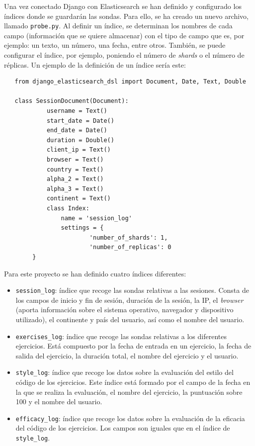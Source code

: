 Una vez conectado Django con Elasticsearch se han definido y configurado los índices donde se guardarán las sondas. Para ello, se ha creado un nuevo archivo, llamado \texttt{probe.py}. Al definir un índice, se determinan los nombres de cada campo (información que se quiere almacenar) con el tipo de campo que es, por ejemplo: un texto, un número, una fecha, entre otros. También, se puede configurar el índice, por ejemplo, poniendo el número de\textit{ shards }o el número de réplicas. Un ejemplo de la definición de un índice sería este: 

\begin{lstlisting}
   from django_elasticsearch_dsl import Document, Date, Text, Double
   
   class SessionDocument(Document):
    		username = Text()
  	  		start_date = Date()
   			end_date = Date()
    		duration = Double()
    		client_ip = Text()
    		browser = Text()
    		country = Text()
    		alpha_2 = Text()
    		alpha_3 = Text()
    		continent = Text()
    		class Index:
        		name = 'session_log'
        		settings = {
            			'number_of_shards': 1,
           				'number_of_replicas': 0
        }
\end{lstlisting} 

Para este proyecto se han definido cuatro índices diferentes:

\begin{itemize}
\item \texttt{session\_log}: índice que recoge las sondas relativas a las sesiones. Consta de los campos de inicio y fin de sesión, duración de la sesión, la IP, el \textit{browser} (aporta información sobre el sistema operativo, navegador y dispositivo utilizado), el continente y país del usuario, así como el nombre del usuario.
\item \texttt{exercises\_log}: índice que recoge las sondas relativas a los diferentes ejercicios. Está compuesto por la fecha de entrada en un ejercicio, la fecha de salida del ejercicio, la duración total, el nombre del ejercicio y el usuario.
\item \texttt{style\_log}: índice que recoge los datos sobre la evaluación del estilo del código de los ejercicios. Este índice está formado por el campo de la fecha en la que se realiza la evaluación, el nombre del ejercicio, la puntuación sobre 100 y el nombre del usuario.
\item \texttt{efficacy\_log}: índice que recoge los datos sobre la evaluación de la eficacia del código de los ejercicios. Los campos son iguales que en el índice de \texttt{style\_log}.
\end{itemize}


